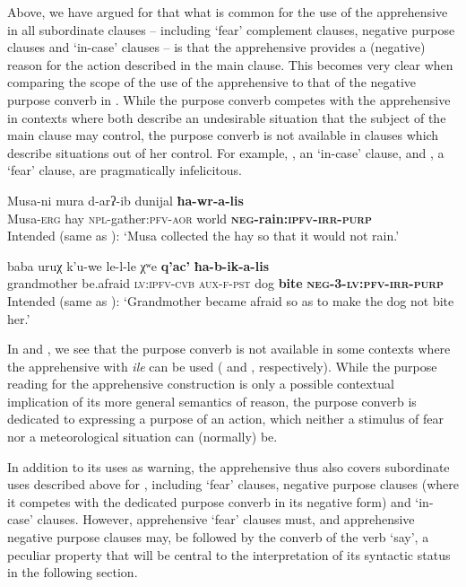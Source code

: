 \documentclass[output=paper,colorlinks,citecolor=brown]{langscibook}
\begin{document}
 Above, we have argued for  that what is common for the use of the apprehensive in all subordinate clauses -- including `fear' complement clauses, negative purpose clauses and `in-case' clauses -- is that the apprehensive provides a (negative) reason for the action described in the main clause. This becomes very clear when comparing the scope of the use of the apprehensive to that of the negative purpose converb in . While the purpose converb competes with the apprehensive in  contexts where both describe an undesirable situation that the subject of the main clause may control, the purpose converb is not available in  clauses which describe situations out of her control. For example,  , an `in-case' clause, and  , a `fear' clause, are pragmatically infelicitous.

\ea \label{ex:DD48}
\gll *Musa-ni mura d-arʔ-ib dunijal \textbf{ħa-wr-a-lis} \\
Musa-\textsc{erg} hay \textsc{npl}-gather:\textsc{pfv-aor} world \textbf{\textsc{neg}-rain:\textsc{ipfv-irr-purp}} \\
\glt Intended (same as ):
 `Musa collected the hay so that it would not rain.'
\z


\ea \label{ex:DD49}
\gll *baba uruχ k'u-we le-l-le χʷe \textbf{q'ac'} \textbf{ħa-b-ik-a-lis} \\
grandmother be.afraid \textsc{lv:ipfv-cvb} \textsc{aux-f-pst} dog \textbf{bite} \textbf{\textsc{neg-3-lv:pfv-irr-purp}} \\
\glt Intended (same as ):  `Grandmother became afraid so as to make the dog not bite her.'
\z


\largerpage
\noindent In  and , we see that the purpose converb is not available in some contexts where the apprehensive with \textit{ile} can be used ( and , respectively). While the purpose reading for the apprehensive construction is only a possible contextual implication of its more general semantics of reason, the purpose converb is dedicated to expressing a purpose of an action, which neither a stimulus of fear nor a meteorological situation can (normally) be.

In addition to its uses as warning, the apprehensive thus also covers subordinate uses described above for , including `fear' clauses, negative purpose clauses (where it competes with the dedicated purpose converb in its negative form) and `in-case' clauses. However, apprehensive `fear' clauses must, and apprehensive negative purpose clauses may, be followed by the converb of the verb `say', a peculiar property that will be central to the interpretation of its syntactic status in the following section.
\end{document}
